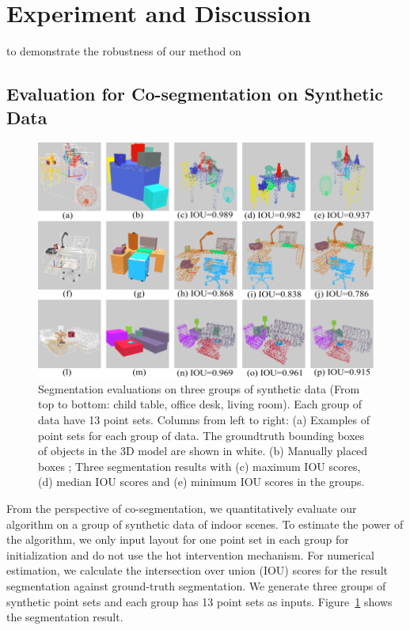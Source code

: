 \section{Experiment and Discussion}

  to demonstrate the robustness of our method on 



\subsection{Evaluation for Co-segmentation on Synthetic Data}
\begin{figure}[htb]
	\centering
	\includegraphics[width=0.8\linewidth]{images/seg/seg}
	\caption{\label{fig:seg} Segmentation evaluations on three groups of synthetic data (From top to bottom: child table, office desk, living room). Each group of data have 13 point sets. Columns from left to right: (a) Examples of point sets for each group of data. The groundtruth bounding boxes of objects in the 3D model are shown in white. (b) Manually placed boxes ; Three segmentation results with (c) maximum IOU scores, (d) median IOU scores and (e) minimum IOU scores in the groups.}
\end{figure}
From the perspective of co-segmentation, we quantitatively evaluate our algorithm on a group of synthetic data of indoor scenes. 
%
To estimate the power of the algorithm, we only input layout for one point set in each group for initialization and do not use the hot intervention mechanism. 
%
For numerical estimation, we calculate the intersection over union (IOU) scores for the result segmentation against ground-truth segmentation. 
We generate three groups of synthetic point sets and each group has 13 point sets as inputs. 
Figure~\ref{fig:seg} shows the segmentation result.


